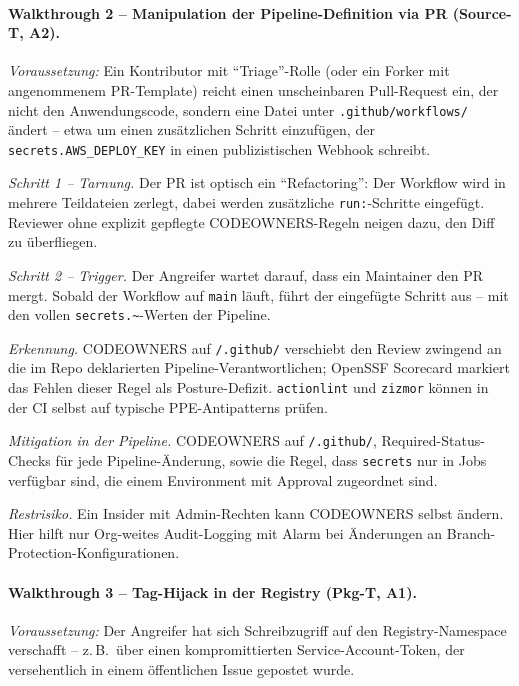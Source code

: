 \documentclass[12pt, a4paper]{scrartcl}
\begin{document}
\paragraph{Walkthrough 2 -- Manipulation der Pipeline-Definition via PR
(Source-T, A2).}
\textit{Voraussetzung:} Ein Kontributor mit \enquote{Triage}-Rolle (oder
ein Forker mit angenommenem PR-Template) reicht einen unscheinbaren
Pull-Request ein, der nicht den Anwendungscode, sondern eine Datei
unter \texttt{.github/workflows/} ändert -- etwa um einen zusätzlichen
Schritt einzufügen, der \texttt{secrets.AWS\_DEPLOY\_KEY} in einen
publizistischen Webhook schreibt.

\textit{Schritt 1 -- Tarnung.} Der PR ist optisch ein
\enquote{Refactoring}: Der Workflow wird in mehrere Teildateien
zerlegt, dabei werden zusätzliche \texttt{run:}-Schritte eingefügt.
Reviewer ohne explizit gepflegte CODEOWNERS-Regeln neigen dazu, den
Diff zu überfliegen.

\textit{Schritt 2 -- Trigger.} Der Angreifer wartet darauf, dass ein
Maintainer den PR mergt. Sobald der Workflow auf \texttt{main} läuft,
führt der eingefügte Schritt aus -- mit den vollen
\texttt{secrets.\textasciitilde}-Werten der Pipeline.

\textit{Erkennung.} CODEOWNERS auf \texttt{/.github/} verschiebt den
Review zwingend an die im Repo deklarierten
Pipeline-Verantwortlichen; OpenSSF Scorecard markiert das Fehlen
dieser Regel als Posture-Defizit. \texttt{actionlint} und
\texttt{zizmor} können in der CI selbst auf typische
PPE-Antipatterns prüfen.

\textit{Mitigation in der Pipeline.} CODEOWNERS auf
\texttt{/.github/}, Required-Status-Checks für jede
Pipeline-Änderung, sowie die Regel, dass \texttt{secrets} nur in Jobs
verfügbar sind, die einem Environment mit Approval zugeordnet sind.

\textit{Restrisiko.} Ein Insider mit Admin-Rechten kann CODEOWNERS
selbst ändern. Hier hilft nur Org-weites Audit-Logging mit Alarm bei
Änderungen an Branch-Protection-Konfigurationen.

\paragraph{Walkthrough 3 -- Tag-Hijack in der Registry
(Pkg-T, A1).}
\textit{Voraussetzung:} Der Angreifer hat sich Schreibzugriff auf den
Registry-Namespace verschafft -- z.\,B.\ über einen kompromittierten
Service-Account-Token, der versehentlich in einem öffentlichen Issue
gepostet wurde.
\end{document}
